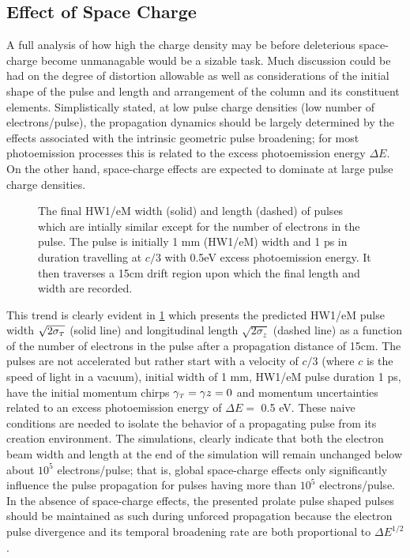 \subsection{Effect of Space Charge} \label{sec:free_spacecharge}

A full analysis of how high the charge density may be before deleterious space-charge become unmanagable would be a sizable task.
Much discussion could be had on the degree of distortion allowable as well as considerations of the initial shape of the pulse and length and arrangement of the column and its constituent elements.
Simplistically stated, at low pulse charge densities (low number of electrons/pulse), the propagation dynamics should be largely determined by the effects associated with the intrinsic geometric pulse broadening; for most photoemission processes this is related to the excess photoemission energy $\Delta E$.
On the other hand, space-charge effects are expected to dominate at large pulse charge densities.

\begin{figure}
  \centering
  \begin{tikzpicture}
    
  \end{tikzpicture}
  \caption[Simplistic free-space pulse evolution vs charge density]{
    The final HW1/eM width (solid) and length (dashed) of pulses which are intially similar except for the number of electrons in the pulse.
    The pulse is initially 1 mm (HW1/eM) width and 1 ps in duration travelling at $c/3$ with 0.5eV excess photoemission energy.
    It then traverses a 15cm drift region upon which the final length and width are recorded.
  }
  \label{fig:spacecharge_noacc}
\end{figure}

This trend is clearly evident in \ref{fig:spacecharge_noacc} which presents the predicted HW1/eM pulse width $\sqrt{2 \sigma_{\smallT}}$ (solid line) and longitudinal length $\sqrt{2 \sigma_{z}}$ (dashed line) as a function of the number of electrons in the pulse after a propagation distance of 15cm.
The pulses are not accelerated but rather start with a velocity of $c/3$ (where $c$ is the speed of light in a vacuum), initial width of 1 mm, HW1/eM pulse duration 1 ps, have the initial momentum chirps $\gamma_{\smallT} = \gamma{z} = 0 $ and momentum uncertainties related to an excess photoemission energy of $\Delta E = $ 0.5 eV.
These naive conditions are needed to isolate the behavior of a propagating pulse from its creation environment.
The simulations, clearly indicate that both the electron beam width and length at the end of the simulation will remain unchanged below about $10^5$ electrons/pulse; that is, global space-charge effects only significantly influence the pulse propagation for pulses having more than $10^5$ electrons/pulse.
In the absence of space-charge effects, the presented prolate pulse shaped pulses should be maintained as such during unforced propagation because the electron pulse divergence and its temporal broadening rate are both proportional to $\Delta E^{1/2}$.

